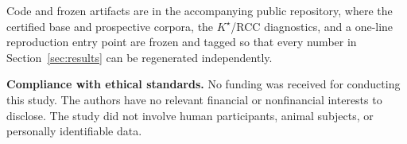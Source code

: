 \documentclass{article}
\begin{document}
Code and frozen artifacts are in the accompanying public
repository, where the certified base and prospective corpora, the
$K^\star$/RCC diagnostics, and a one-line reproduction entry point
are frozen and tagged so that every number in
Section~\ref{sec:results} can be regenerated independently.

\clearpage
\noindent\textbf{Compliance with ethical standards.}
No funding was received for conducting this study.
The authors have no relevant financial or nonfinancial interests
to disclose.
The study did not involve human participants, animal subjects, or
personally identifiable data.



\end{document}
